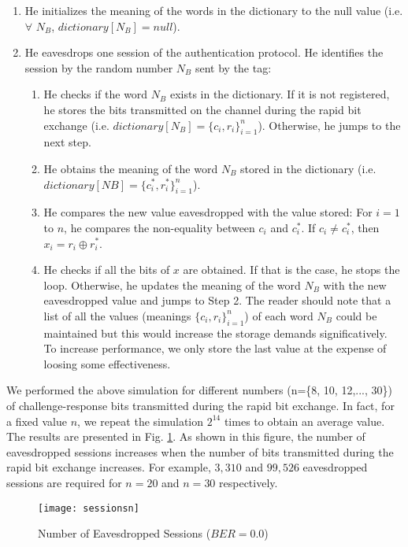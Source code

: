\documentclass{article}
\begin{document}
\begin{enumerate}
  \item  He initializes the meaning of the words in the dictionary to the null value (i.e. $\forall$ $N_B$, $dictionary[N_B]=null$).
  \item  He eavesdrops one session of the authentication protocol. He identifies the session by the random number $N_B$ sent by the tag:
      \begin{enumerate}
      \item He checks if the word $N_B$ exists in the dictionary. If it is not registered, he stores the bits transmitted on the channel during the rapid bit exchange (i.e. $dictionary[N_B] = \{c_i, r_i\}_{i=1}^n$). Otherwise, he jumps to the next step.
      \item He obtains the meaning of the word $N_B$ stored in the dictionary (i.e. $dictionary[NB] = \{c^*_i, r^*_i\}_{i=1}^n$).
      \item He compares the new value eavesdropped with the value stored:
      For $i=1$ to $n$, he compares the non-equality between $c_i$ and $c^*_i$. If $c_i \neq c^*_i$, then $x_i = r_i \oplus r^*_i$.
      \item He checks if all the bits of $x$ are obtained. If that is the case, he stops the loop. Otherwise, he updates the meaning of the word $N_B$ with the new eavesdropped value and jumps to Step 2. The reader should note that a list of all the values (meanings $\{c_i, r_i\}_{i=1}^n$) of each word $N_B$ could be maintained but this would increase the storage demands significatively. To increase performance, we only store the last value at the expense of loosing some effectiveness.
    \end{enumerate}
\end{enumerate}

We performed the above simulation for different numbers (n=\{8, 10, 12,..., 30\}) of challenge-response bits transmitted during the rapid bit exchange.  In fact, for a fixed value $n$, we repeat the simulation $2^{14}$ times to obtain an average value. The results are presented in Fig. \ref{fig::fig2}. As shown in this figure, the number of eavesdropped sessions increases when the number of bits transmitted during the rapid bit exchange increases. For example, $3,310$ and $99,526$ eavesdropped sessions are required for $n = 20$ and $n = 30$ respectively.

\begin{figure}
\centering
\texttt{[image: sessionsn]}\\
  \caption{Number of Eavesdropped Sessions ($BER=0.0$)}\label{fig::fig2}
\end{figure}
\end{document}
